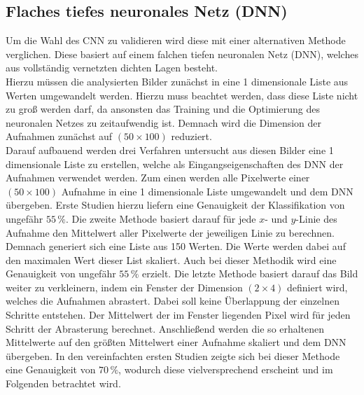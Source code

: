 \subsection{Flaches tiefes neuronales Netz (DNN)}

Um die Wahl des CNN zu validieren wird diese mit einer alternativen Methode verglichen. Diese basiert auf einem falchen tiefen neuronalen Netz (DNN), welches aus vollständig vernetzten dichten Lagen besteht. \\
Hierzu müssen die analysierten Bilder zunächst in eine 1 dimensionale Liste aus Werten umgewandelt werden. Hierzu muss beachtet werden, dass diese Liste nicht zu groß werden darf, da ansonsten das Training und die Optimierung des neuronalen Netzes zu zeitaufwendig ist. Demnach wird die Dimension der Aufnahmen zunächst auf $(50\times 100)$ reduziert.\\
Darauf aufbauend werden drei Verfahren untersucht aus diesen Bilder eine 1 dimensionale Liste zu erstellen, welche als Eingangseigenschaften des DNN der Aufnahmen verwendet werden. Zum einen werden alle Pixelwerte einer $(50\times 100)$ Aufnahme in eine 1 dimensionale Liste umgewandelt und dem DNN übergeben. Erste Studien hierzu liefern eine Genauigkeit der Klassifikation von ungefähr $55\,\%$. Die zweite Methode basiert darauf für jede $x$- und $y$-Linie des Aufnahme den Mittelwert aller Pixelwerte der jeweiligen Linie zu berechnen. Demnach generiert sich eine Liste aus 150 Werten. Die Werte werden dabei auf den maximalen Wert dieser List skaliert. Auch bei dieser Methodik wird eine Genauigkeit von ungefähr $55\,\%$ erzielt. Die letzte Methode basiert darauf das Bild weiter zu verkleinern, indem ein Fenster der Dimension $(2\times 4)$ definiert wird, welches die Aufnahmen abrastert. Dabei soll keine Überlappung der einzelnen Schritte entstehen. Der Mittelwert der im Fenster liegenden Pixel wird für jeden Schritt der Abrasterung berechnet. Anschließend werden die so erhaltenen Mittelwerte auf den größten Mittelwert einer Aufnahme skaliert und dem DNN übergeben. In den vereinfachten ersten Studien zeigte sich bei dieser Methode eine Genauigkeit von $70\,\%$, wodurch diese vielversprechend erscheint und im Folgenden betrachtet wird. \\
